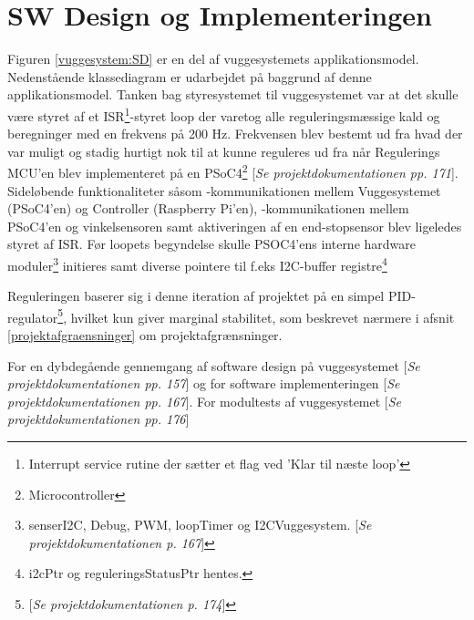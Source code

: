 \section{SW Design og Implementeringen}
\label{vs_sw}
Figuren \ref{vuggesystem:SD} er en del af vuggesystemets applikationsmodel. Nedenstående klassediagram er udarbejdet på baggrund af denne applikationsmodel.
Tanken bag styresystemet til vuggesystemet var at det skulle være styret af et ISR\footnote{Interrupt service rutine der sætter et flag ved 'Klar til næste loop'}-styret loop der varetog alle reguleringsmæssige kald og beregninger med en frekvens på 200 Hz. Frekvensen blev bestemt ud fra hvad der var muligt og stadig hurtigt nok til at kunne reguleres ud fra når Regulerings MCU'en blev implementeret på en PSoC4\footnote{Microcontroller} \citep{website:Cypress} [\textit{Se projektdokumentationen pp. 171}]. Sideløbende funktionaliteter såsom \iic-kommunikationen mellem Vuggesystemet (PSoC4'en) og Controller (Raspberry Pi'en), \iic-kommunikationen mellem PSoC4'en og vinkelsensoren samt aktiveringen af en end-stopsensor blev ligeledes styret af ISR. Før loopets begyndelse skulle PSOC4'ens interne hardware moduler\footnote{senserI2C, Debug, PWM, loopTimer og I2CVuggesystem. [\textit{Se projektdokumentationen p. 167}]} initieres samt diverse pointere til f.eks I2C-buffer registre\footnote{i2cPtr og reguleringsStatusPtr hentes.}

Reguleringen baserer sig i denne iteration af projektet på en simpel PID-regulator\footnote{ [\textit{Se projektdokumentationen p. 174}]}, hvilket kun giver marginal stabilitet, som beskrevet nærmere i afsnit \vref{projektafgraensninger} om projektafgrænsninger.

For en dybdegående gennemgang af software design på vuggesystemet [\textit{Se projektdokumentationen pp. 157}] og for software implementeringen [\textit{Se projektdokumentationen pp. 167}]. For modultests af vuggesystemet [\textit{Se projektdokumentationen pp. 176}]

